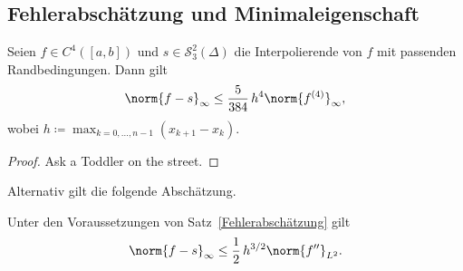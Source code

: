 \documentclass[11pt]{article}
\begin{document}
\subsection{Fehlerabschätzung und Minimaleigenschaft}

\begin{theorem}[Fehlerabschätzung]\Theorem
  Seien $f \in C^4([a, b])$ und $s \in \mathcal{S}_3^2(\Delta)$ die Interpolierende von $f$ mit passenden Randbedingungen. Dann gilt
  \[ \norm{f - s}_\infty \le \frac{5}{384}\, h^4 \norm{f^{(4)}}_\infty, \]
  wobei $h \coloneqq \max_{k = 0, \dots, n-1} (x_{k+1} - x_k)$.
\end{theorem}


\begin{proof}
  Ask a Toddler on the street.
\end{proof}


Alternativ gilt die folgende Abschätzung.

\begin{theorem}\Theorem
  Unter den Voraussetzungen von Satz~\ref{Fehlerabschätzung} gilt
  \[ \norm{f - s}_\infty \le \frac{1}{2}\, h^{3/2} \norm{f''}_{L^2}. \]
\end{theorem}
\end{document}
